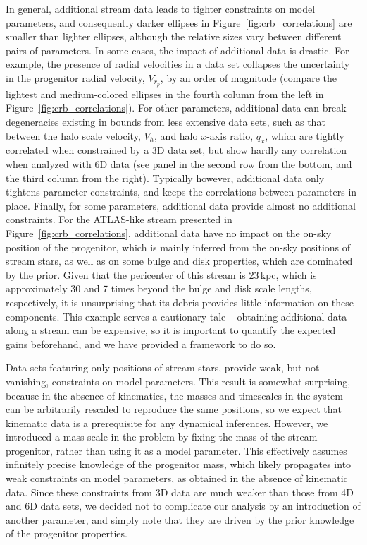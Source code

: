 \documentclass[modern]{aastex62}
\begin{document}
In general, additional stream data leads to tighter constraints on model parameters, and consequently darker ellipses in Figure~\ref{fig:crb_correlations} are smaller than lighter ellipses, although the relative sizes vary between different pairs of parameters.
In some cases, the impact of additional data is drastic.
For example, the presence of radial velocities in a data set collapses the uncertainty in the progenitor radial velocity, $V_{r_p}$, by an order of magnitude (compare the lightest and medium-colored ellipses in the fourth column from the left in Figure~\ref{fig:crb_correlations}).
For other parameters, additional data can break degeneracies existing in bounds from less extensive data sets, such as that between the halo scale velocity, $V_h$, and halo $x$-axis ratio, $q_x$, which are tightly correlated when constrained by a 3D data set, but show hardly any correlation when analyzed with 6D data (see panel in the second row from the bottom, and the third column from the right).
Typically however, additional data only tightens parameter constraints, and keeps the correlations between parameters in place.
Finally, for some parameters, additional data provide almost no additional constraints.
For the ATLAS-like stream presented in Figure~\ref{fig:crb_correlations}, additional data have no impact on the on-sky position of the progenitor, which is mainly inferred from the on-sky positions of stream stars, as well as on some bulge and disk properties, which are dominated by the prior.
Given that the pericenter of this stream is 23\,kpc, which is approximately 30 and 7 times beyond the bulge and disk scale lengths, respectively, it is unsurprising that its debris provides little information on these components.
This example serves a cautionary tale -- obtaining additional data along a stream can be expensive, so it is important to quantify the expected gains beforehand, and we have provided a framework to do so.

Data sets featuring only positions of stream stars, provide weak, but not vanishing, constraints on model parameters.
This result is somewhat surprising, because in the absence of kinematics, the masses and timescales in the system can be arbitrarily rescaled to reproduce the same positions, so we expect that kinematic data is a prerequisite for any dynamical inferences.
However, we introduced a mass scale in the problem by fixing the mass of the stream progenitor, rather than using it as a model parameter.
This effectively assumes infinitely precise knowledge of the progenitor mass, which likely propagates into weak constraints on model parameters, as obtained in the absence of kinematic data.
Since these constraints from 3D data are much weaker than those from 4D and 6D data sets, we decided not to complicate our analysis by an introduction of another parameter, and simply note that they are driven by the prior knowledge of the progenitor properties.
\end{document}
